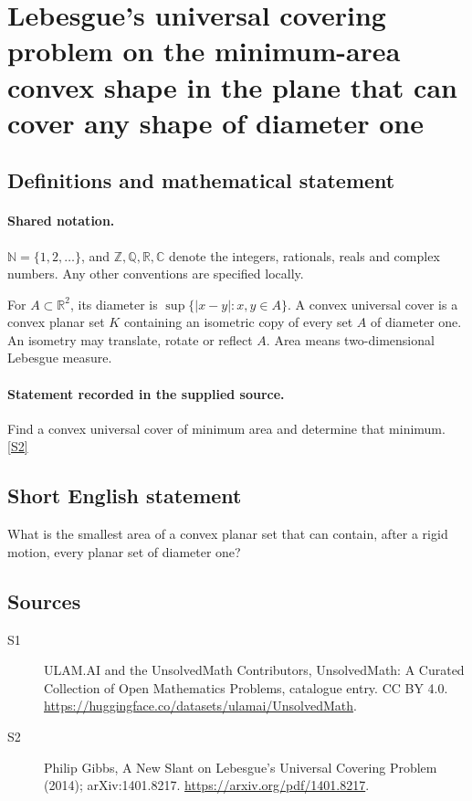 \documentclass[11pt]{article}
\newcommand{\sref}[2]{\hyperlink{source:#1:#2}{[S#2]}}
\begin{document}
\section{Lebesgue's universal covering problem on the minimum-area convex shape in the plane that can cover any shape of diameter one}\label{statement}

\subsection{Definitions and mathematical statement}

\paragraph{Shared notation.}$\mathbb N=\{1,2,\ldots\}$, and $\mathbb Z,\mathbb Q,\mathbb R,\mathbb C$ denote the integers, rationals, reals and complex numbers. Any other conventions are specified locally.


For $A\subset\mathbb R^2$, its diameter is $\sup\{|x-y|:x,y\in A\}$. A convex universal cover is a convex planar set $K$ containing an isometric copy of every set $A$ of diameter one. An isometry may translate, rotate or reflect $A$. Area means two-dimensional Lebesgue measure.
\paragraph{Statement recorded in the supplied source.}
Find a convex universal cover of minimum area and determine that minimum. \sref{statement}{2}
\subsection{Short English statement}
What is the smallest area of a convex planar set that can contain, after a rigid motion, every planar set of diameter one?
\subsection{Sources}
\begin{description}
\item[\hypertarget{source:statement:1}{S1}] ULAM.AI and the UnsolvedMath Contributors, UnsolvedMath: A Curated Collection of Open Mathematics Problems, catalogue entry. CC BY 4.0. \url{https://huggingface.co/datasets/ulamai/UnsolvedMath}.
\item[\hypertarget{source:statement:2}{S2}] Philip Gibbs, A New Slant on Lebesgue’s Universal Covering Problem (2014); arXiv:1401.8217. \url{https://arxiv.org/pdf/1401.8217}.
\end{description}
\label{end:statement}
\end{document}
